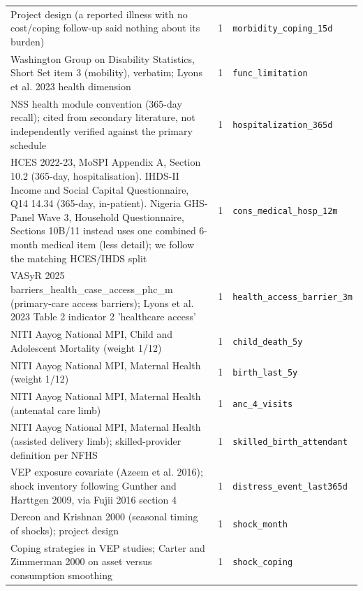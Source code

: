 \documentclass[9pt,a4paper,landscape]{article}
\begin{document}
\begin{longtable}{@{}p{9.5cm}p{1.2cm}p{12.5cm}@{}}
\scriptsize Project design (a reported illness with no cost/coping follow-up said nothing about its burden) & \scriptsize 1 & \scriptsize\texttt{morbidity\_coping\_15d}\\
\scriptsize Washington Group on Disability Statistics, Short Set item 3 (mobility), verbatim; Lyons et al. 2023 health dimension & \scriptsize 1 & \scriptsize\texttt{func\_limitation}\\
\scriptsize NSS health module convention (365-day recall); cited from secondary literature, not independently verified against the primary schedule & \scriptsize 1 & \scriptsize\texttt{hospitalization\_365d}\\
\scriptsize HCES 2022-23, MoSPI Appendix A, Section 10.2 (365-day, hospitalisation). IHDS-II Income and Social Capital Questionnaire, Q14 14.34 (365-day, in-patient). Nigeria GHS-Panel Wave 3, Household Questionnaire, Sections 10B/11 instead uses one combined 6-month medical item (less detail); we follow the matching HCES/IHDS split & \scriptsize 1 & \scriptsize\texttt{cons\_medical\_hosp\_12m}\\
\scriptsize VASyR 2025 barriers\_health\_case\_access\_phc\_m (primary-care access barriers); Lyons et al. 2023 Table 2 indicator 2 'healthcare access' & \scriptsize 1 & \scriptsize\texttt{health\_access\_barrier\_3m}\\
\scriptsize NITI Aayog National MPI, Child and Adolescent Mortality (weight 1/12) & \scriptsize 1 & \scriptsize\texttt{child\_death\_5y}\\
\scriptsize NITI Aayog National MPI, Maternal Health (weight 1/12) & \scriptsize 1 & \scriptsize\texttt{birth\_last\_5y}\\
\scriptsize NITI Aayog National MPI, Maternal Health (antenatal care limb) & \scriptsize 1 & \scriptsize\texttt{anc\_4\_visits}\\
\scriptsize NITI Aayog National MPI, Maternal Health (assisted delivery limb); skilled-provider definition per NFHS & \scriptsize 1 & \scriptsize\texttt{skilled\_birth\_attendant}\\
\scriptsize VEP exposure covariate (Azeem et al. 2016); shock inventory following Gunther and Harttgen 2009, via Fujii 2016 section 4 & \scriptsize 1 & \scriptsize\texttt{distress\_event\_last365d}\\
\scriptsize Dercon and Krishnan 2000 (seasonal timing of shocks); project design & \scriptsize 1 & \scriptsize\texttt{shock\_month}\\
\scriptsize Coping strategies in VEP studies; Carter and Zimmerman 2000 on asset versus consumption smoothing & \scriptsize 1 & \scriptsize\texttt{shock\_coping}\\

\end{longtable}
\end{document}
